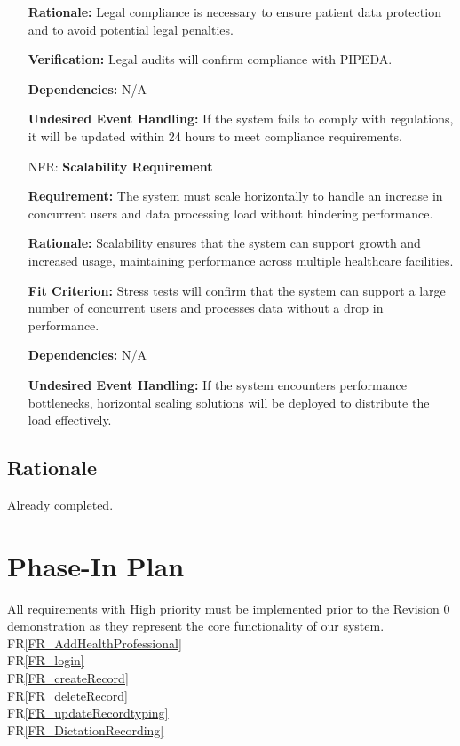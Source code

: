 \documentclass[12pt]{article}
\newcounter{nfrnum} %
\begin{document}
\begin{itemize}
    \textbf{Rationale:} Legal compliance is necessary to ensure patient data protection and to avoid potential legal penalties.
    
    \textbf{Verification:} Legal audits will confirm compliance with PIPEDA.
    
    \textbf{Dependencies:} N/A
    
    \textbf{Undesired Event Handling:} If the system fails to comply with regulations, it will be updated within 24 hours to meet compliance requirements.

\item[NFR\refstepcounter{nfrnum}\thenfrnum \label{NFR_Scalability}:] \textbf{Scalability Requirement}

    \textbf{Requirement:} The system must scale horizontally to handle an increase in concurrent users and data processing load without hindering performance.

    \textbf{Rationale:} Scalability ensures that the system can support growth and increased usage, maintaining performance across multiple healthcare facilities.  

    \textbf{Fit Criterion:}  Stress tests will confirm that the system can support a large number of concurrent users and processes data without a drop in performance.  

    \textbf{Dependencies:} N/A

    \textbf{Undesired Event Handling:} If the system encounters performance bottlenecks, horizontal scaling solutions will be deployed to distribute the load effectively.

\end{itemize}

\subsection{Rationale}

Already completed.

\section{Phase-In Plan}

All requirements with High priority must be implemented prior to the Revision 0 demonstration as they represent the core functionality of our system.\\
FR\ref{FR_AddHealthProfessional}\\
FR\ref{FR_login}\\
FR\ref{FR_createRecord}\\
FR\ref{FR_deleteRecord}\\
FR\ref{FR_updateRecordtyping}\\ 
FR\ref{FR_DictationRecording}\\
\end{document}
